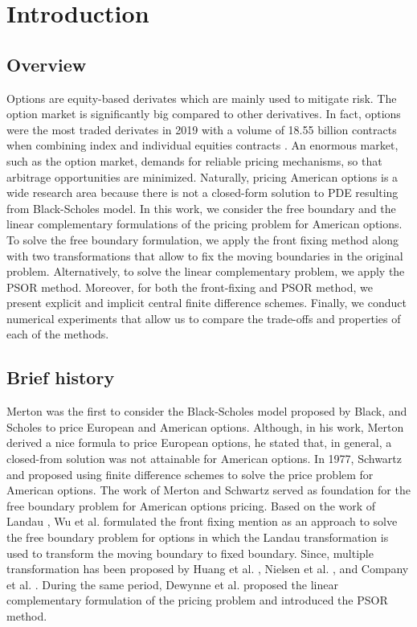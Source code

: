 \section{Introduction}

\subsection{Overview}

Options are equity-based derivates which are mainly used to mitigate risk. 
The option market is significantly big compared to other derivatives. 
In fact, options were the most traded 
derivates in 2019 with a volume of 18.55 billion contracts when combining 
index and individual equities contracts \cite{statista_2019}. 
An enormous market, such as the option market, demands for reliable pricing 
mechanisms, so that arbitrage opportunities are minimized. Naturally, pricing 
American options is a wide research area because there is not a closed-form
solution to PDE resulting from Black-Scholes model. In this work,
we consider the free boundary and the linear complementary formulations of the 
pricing problem for American options. To solve the free boundary formulation,
we apply the front fixing method along with two transformations that allow to fix
the moving boundaries in the original problem. Alternatively, to solve the linear complementary problem, we apply the PSOR 
method. Moreover, for both the front-fixing and PSOR method, we present explicit 
and implicit central finite difference schemes. Finally, we conduct numerical 
experiments that allow us to compare the trade-offs and properties of each of 
the methods.

\subsection{Brief history}

Merton \cite{merton_1973} was the first to consider the Black-Scholes model 
proposed by Black, and Scholes \cite{black_scholes_1973} to price European
and American options. Although, in his work, Merton derived a nice formula 
to price European options, he stated that, in general, a closed-from solution 
was not attainable for American options. In 1977, Schwartz \cite*{schwartz_197779}
and \cite{brennan_1997} proposed using finite difference schemes 
to solve the price problem for American options. The work of Merton and Schwartz
served as foundation for the free boundary problem for American options pricing.
Based on the work of Landau \cite*{landau_1950_heat_ci}, 
Wu et al. \cite{wu1997front} formulated the front fixing mention as an approach 
to solve the free boundary problem for options in which the Landau transformation
is used to transform the moving boundary to fixed boundary. Since, multiple transformation has 
been proposed by Huang et al. \cite*{huang_2000}, Nielsen et al. \cite*{nielsen_2001},
and Company et al. \cite*{company_egorova_jodar_2014}. During the same period, 
Dewynne et al. \cite*{dewynne_howison_rupf_wilmott_1993} proposed the linear 
complementary formulation of the pricing problem and introduced the PSOR method.

